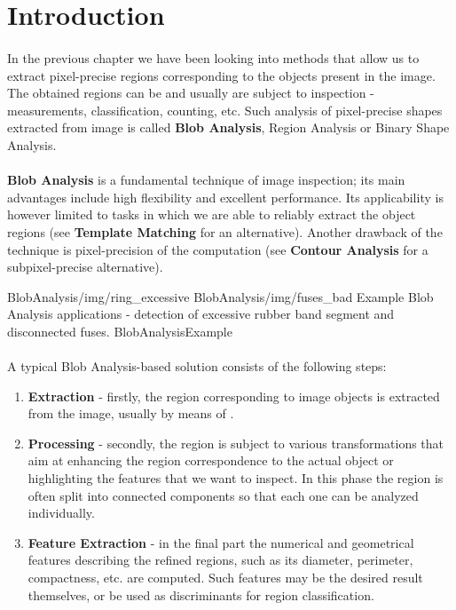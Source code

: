\section{Introduction}

\paragraph*{}
In the previous chapter we have been looking into methods that allow us to extract pixel-precise regions corresponding to the objects present in the image. The obtained regions can be and usually are subject to inspection - measurements, classification, counting, etc. Such analysis of pixel-precise shapes extracted from image is called \textbf{Blob Analysis}, Region Analysis or Binary Shape Analysis.

\paragraph*{}
\textbf{Blob Analysis} is a fundamental technique of image inspection; its main advantages include high flexibility and excellent performance. Its applicability is however limited to tasks in which we are able to reliably extract the object regions (see \textbf{Template Matching} for an alternative). Another drawback of the technique is pixel-precision of the computation (see \textbf{Contour Analysis} for a subpixel-precise alternative).

\twoFigures
{BlobAnalysis/img/ring_excessive}
{BlobAnalysis/img/fuses_bad}
{Example Blob Analysis applications - detection of excessive rubber band segment and disconnected fuses.}
{BlobAnalysisExample}
{\basicWidth}

\paragraph*{}
A typical Blob Analysis-based solution consists of the following steps:
\begin{enumerate}
	\item \textbf{Extraction} - firstly, the region corresponding to image objects is extracted from the image, usually by means of .
	\item \textbf{Processing} - secondly, the region is subject to various transformations that aim at enhancing the region correspondence to the actual object or highlighting the features that we want to inspect. In this phase the region is often split into connected components so that each one can be analyzed individually.
	\item \textbf{Feature Extraction} - in the final part the numerical and geometrical features describing the refined regions, such as its diameter, perimeter, compactness, etc. are computed. Such features may be the desired result themselves, or be used as discriminants for region classification.
\end{enumerate}

